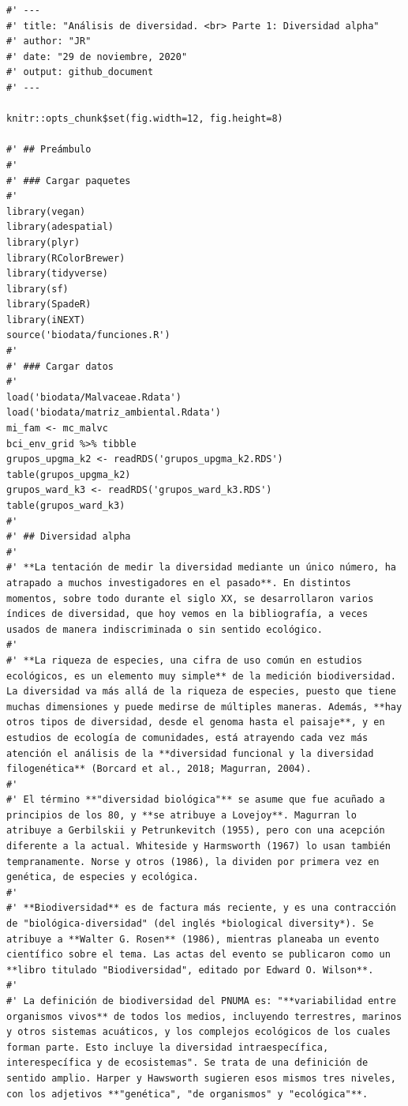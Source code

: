 \documentclass[11pt,]{article}
\begin{document}
\begin{verbatim}
#' ---
#' title: "Análisis de diversidad. <br> Parte 1: Diversidad alpha"
#' author: "JR"
#' date: "29 de noviembre, 2020"
#' output: github_document
#' ---

knitr::opts_chunk$set(fig.width=12, fig.height=8)

#' ## Preámbulo
#' 
#' ### Cargar paquetes
#' 
library(vegan)
library(adespatial)
library(plyr)
library(RColorBrewer)
library(tidyverse)
library(sf)
library(SpadeR)
library(iNEXT)
source('biodata/funciones.R')
#' 
#' ### Cargar datos
#' 
load('biodata/Malvaceae.Rdata')
load('biodata/matriz_ambiental.Rdata')
mi_fam <- mc_malvc
bci_env_grid %>% tibble
grupos_upgma_k2 <- readRDS('grupos_upgma_k2.RDS')
table(grupos_upgma_k2)
grupos_ward_k3 <- readRDS('grupos_ward_k3.RDS')
table(grupos_ward_k3)
#' 
#' ## Diversidad alpha
#' 
#' **La tentación de medir la diversidad mediante un único número, ha atrapado a muchos investigadores en el pasado**. En distintos momentos, sobre todo durante el siglo XX, se desarrollaron varios índices de diversidad, que hoy vemos en la bibliografía, a veces usados de manera indiscriminada o sin sentido ecológico.
#' 
#' **La riqueza de especies, una cifra de uso común en estudios ecológicos, es un elemento muy simple** de la medición biodiversidad. La diversidad va más allá de la riqueza de especies, puesto que tiene muchas dimensiones y puede medirse de múltiples maneras. Además, **hay otros tipos de diversidad, desde el genoma hasta el paisaje**, y en estudios de ecología de comunidades, está atrayendo cada vez más atención el análisis de la **diversidad funcional y la diversidad filogenética** (Borcard et al., 2018; Magurran, 2004).
#' 
#' El término **"diversidad biológica"** se asume que fue acuñado a principios de los 80, y **se atribuye a Lovejoy**. Magurran lo atribuye a Gerbilskii y Petrunkevitch (1955), pero con una acepción diferente a la actual. Whiteside y Harmsworth (1967) lo usan también tempranamente. Norse y otros (1986), la dividen por primera vez en genética, de especies y ecológica.
#' 
#' **Biodiversidad** es de factura más reciente, y es una contracción de "biológica-diversidad" (del inglés *biological diversity*). Se atribuye a **Walter G. Rosen** (1986), mientras planeaba un evento científico sobre el tema. Las actas del evento se publicaron como un **libro titulado "Biodiversidad", editado por Edward O. Wilson**.
#' 
#' La definición de biodiversidad del PNUMA es: "**variabilidad entre organismos vivos** de todos los medios, incluyendo terrestres, marinos y otros sistemas acuáticos, y los complejos ecológicos de los cuales forman parte. Esto incluye la diversidad intraespecífica, interespecífica y de ecosistemas". Se trata de una definición de sentido amplio. Harper y Hawsworth sugieren esos mismos tres niveles, con los adjetivos **"genética", "de organismos" y "ecológica"**.

\end{verbatim}
\end{document}

